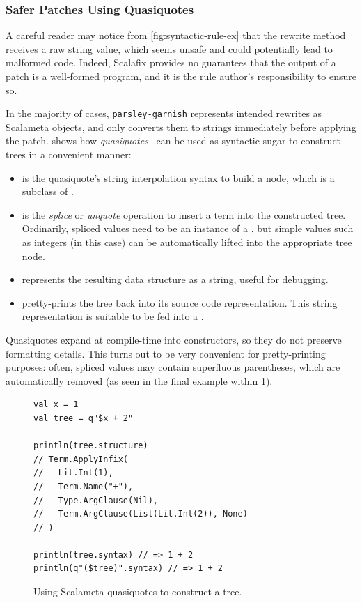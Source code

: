 \documentclass[../../main.tex]{subfiles}
\begin{document}
\subsubsection{Safer Patches Using Quasiquotes}
A careful reader may notice from \cref{fig:syntactic-rule-ex} that the  rewrite method receives a raw string value, which seems unsafe and could potentially lead to malformed code.
Indeed, Scalafix provides no guarantees that the output of a patch is a well-formed program, and it is the rule author's responsibility to ensure so.

In the majority of cases, \texttt{parsley-garnish} represents intended rewrites as Scalameta  objects, and only converts them to strings immediately before applying the patch.
 shows how \emph{quasiquotes}~\cite{shabalin_quasiquotes_2013} can be used as syntactic sugar to construct trees in a convenient manner:
\begin{itemize}
  \item {} is the quasiquote's string interpolation syntax to build a  node, which is a subclass of .
  \item {} is the \emph{splice} or \emph{unquote} operation to insert a term into the constructed tree. Ordinarily, spliced values need to be an instance of a , but simple values such as integers (in this case) can be automatically lifted into the appropriate tree node.
  \item {} represents the resulting  data structure as a string, useful for debugging.
  \item {} pretty-prints the tree back into its source code representation. This string representation is suitable to be fed into a .
\end{itemize}
Quasiquotes expand at compile-time into  constructors, so they do not preserve formatting details.
This turns out to be very convenient for pretty-printing purposes: often, spliced values may contain superfluous parentheses, which are automatically removed (as seen in the final example within \cref{fig:quasiquote-ex}).

\begin{figure}[htbp]
\begin{verbatim}
val x = 1
val tree = q"$x + 2"

println(tree.structure)
// Term.ApplyInfix(
//   Lit.Int(1),
//   Term.Name("+"),
//   Type.ArgClause(Nil),
//   Term.ArgClause(List(Lit.Int(2)), None)
// )

println(tree.syntax) // => 1 + 2
println(q"($tree)".syntax) // => 1 + 2
\end{verbatim}
\caption{Using Scalameta quasiquotes to construct a tree.}
\label{fig:quasiquote-ex}
\end{figure}
\end{document}
